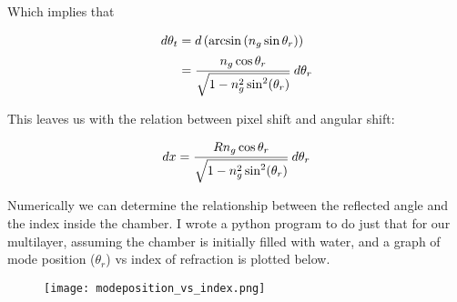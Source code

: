 Which implies that

\begin{equation*}
\begin{split}
	d\theta_t & = d\left(\arcsin\left(n_g \sin{\theta_r}\right)\right) \\
			  & = \cfrac{n_g \cos{\theta_r}}{\sqrt{1-n_g^2 \sin^{2}(\theta_r)}}\,\,d\theta_r
\end{split}
\end{equation*}


This leaves us with the relation between pixel shift and angular shift:

\begin{equation}
	dx = \cfrac{R n_g \cos{\theta_r}}{\sqrt{1-n_g^2 \sin^{2}(\theta_r)}} \,\,d\theta_r
\end{equation}

Numerically we can determine the relationship between the reflected angle and the index inside the chamber. I wrote a python program to do just that for our multilayer, assuming the chamber is initially filled with water, and a graph of mode position ($\theta_r$) vs index of refraction is plotted below.

\begin{figure}[h]
\begin{center}
\texttt{[image: modeposition\_vs\_index.png]}
\end{center}
\end{figure}